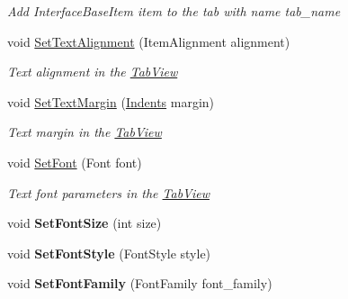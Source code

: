 \begin{DoxyCompactItemize}
\begin{DoxyCompactList}\small\item\em Add Interface\+Base\+Item item to the tab with name tab\+\_\+name \end{DoxyCompactList}\item 
void \mbox{\hyperlink{class_space_v_i_l_1_1_tab_view_abdd2253b42ef61e32efb3115c679bbc5}{Set\+Text\+Alignment}} (Item\+Alignment alignment)
\begin{DoxyCompactList}\small\item\em Text alignment in the \mbox{\hyperlink{class_space_v_i_l_1_1_tab_view}{Tab\+View}} \end{DoxyCompactList}\item 
void \mbox{\hyperlink{class_space_v_i_l_1_1_tab_view_af857743fb5c8b39d4090b5ae49f7abd5}{Set\+Text\+Margin}} (\mbox{\hyperlink{struct_space_v_i_l_1_1_decorations_1_1_indents}{Indents}} margin)
\begin{DoxyCompactList}\small\item\em Text margin in the \mbox{\hyperlink{class_space_v_i_l_1_1_tab_view}{Tab\+View}} \end{DoxyCompactList}\item 
void \mbox{\hyperlink{class_space_v_i_l_1_1_tab_view_a11d514c4024aae136840d60b14b61e3c}{Set\+Font}} (Font font)
\begin{DoxyCompactList}\small\item\em Text font parameters in the \mbox{\hyperlink{class_space_v_i_l_1_1_tab_view}{Tab\+View}} \end{DoxyCompactList}\item 
\mbox{\label{class_space_v_i_l_1_1_tab_view_a79db651164f9bc85e4c8a56272164127}} 
void {\bfseries Set\+Font\+Size} (int size)
\item 
\mbox{\label{class_space_v_i_l_1_1_tab_view_aa7b1747dce9403d6aed324d7f2ba959e}} 
void {\bfseries Set\+Font\+Style} (Font\+Style style)
\item 
\mbox{\label{class_space_v_i_l_1_1_tab_view_af8eb5cd9da3f6f7bed2094634893b8b2}} 
void {\bfseries Set\+Font\+Family} (Font\+Family font\+\_\+family)
\item 
\mbox{\label{class_space_v_i_l_1_1_tab_view_ae80a0f1fd1f47ad736712d5fb9578718}} 

\end{DoxyCompactItemize}
